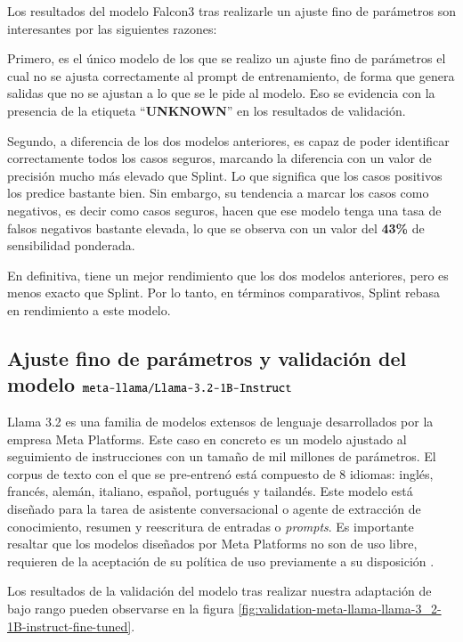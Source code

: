 \documentclass[12pt, a4paper, twoside]{article}
\begin{document}
Los resultados del modelo Falcon3 tras realizarle un ajuste fino de parámetros son interesantes por las siguientes razones:

Primero, es el único modelo de los que se realizo un ajuste fino de parámetros el cual no se ajusta correctamente al prompt de entrenamiento, de forma que genera salidas que no se ajustan a lo que se le pide al modelo. Eso se evidencia con la presencia de la etiqueta \enquote{\textbf{UNKNOWN}} en los resultados de validación.

Segundo, a diferencia de los dos modelos anteriores, es capaz de poder identificar correctamente todos los casos seguros, marcando la diferencia con un valor de precisión mucho más elevado que Splint. Lo que significa que los casos positivos los predice bastante bien. Sin embargo, su tendencia a marcar los casos como negativos, es decir como casos seguros, hacen que ese modelo tenga una tasa de falsos negativos bastante elevada, lo que se observa con un valor del \textbf{43\%} de sensibilidad ponderada.

En definitiva, tiene un mejor rendimiento que los dos modelos anteriores, pero es menos exacto que Splint. Por lo tanto, en términos comparativos, Splint rebasa en rendimiento a este modelo.

\subsection{Ajuste fino de parámetros y validación del modelo $\protect\\ \texttt{meta-llama/Llama-3.2-1B-Instruct}$}
Llama 3.2 es una familia de modelos extensos de lenguaje desarrollados por la empresa Meta Platforms. Este caso en concreto es un modelo ajustado al seguimiento de instrucciones con un tamaño de mil millones de parámetros. El corpus de texto con el que se pre-entrenó está compuesto de 8 idiomas: inglés, francés, alemán, italiano, español, portugués y tailandés. Este modelo está diseñado para la tarea de asistente conversacional o agente de extracción de conocimiento, resumen y reescritura de entradas o \textit{prompts}. Es importante resaltar que los modelos diseñados por Meta Platforms no son de uso libre, requieren de la aceptación de su política de uso previamente a su disposición \cite{llama-3_2-1B-huggingface}.

Los resultados de la validación del modelo tras realizar nuestra adaptación de bajo rango pueden observarse en la figura \ref{fig:validation-meta-llama-llama-3_2-1B-instruct-fine-tuned}.
\end{document}
